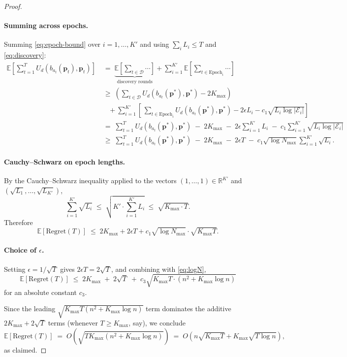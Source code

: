 \documentclass[11pt]{article}
\newcommand{\pvec}{\mathbf{p}}
\newcommand{\cE}{\mathcal{E}}
\newcommand{\cD}{\mathcal{D}}
\newcommand{\EE}{\mathbb{E}}
\newcommand{\RR}{\mathbb{R}}
\newcommand{\Kmax}{K_{\max}}
\begin{document}
\begin{proof}
\paragraph{Summing across epochs.} Summing \eqref{eq:epoch-bound} over $i=1,\dots,K'$ and using $\sum_i L_i \le T$ and \eqref{eq:discovery}:
\begin{align*}
\EE\!\left[\sum_{t=1}^T U_d(b_{a_t}(\pvec_t), \pvec_t)\right]
&\;=\; \underbrace{\EE\!\left[\sum_{t\in\cD} \cdots\right]}_{\text{discovery rounds}} + \sum_{i=1}^{K'} \EE\!\left[\sum_{t\in\mathrm{Epoch}_i}\cdots\right] \\
&\;\ge\; \left(\sum_{t\in\cD} U_d(b_{a_t}(\pvec^{*}), \pvec^{*}) - 2\Kmax\right) \\
&\quad+ \sum_{i=1}^{K'}\!\left[\,\sum_{t\in\mathrm{Epoch}_i} U_d(b_{a_t}(\pvec^{*}), \pvec^{*}) - 2\epsilon L_i - c_1\sqrt{L_i\log|\cE_i|}\right] \\
&\;=\; \sum_{t=1}^T U_d(b_{a_t}(\pvec^{*}),\pvec^{*}) \;-\; 2\Kmax \;-\; 2\epsilon\!\sum_{i=1}^{K'} L_i \;-\; c_1\!\sum_{i=1}^{K'}\sqrt{L_i \log|\cE_i|} \\
&\;\ge\; \sum_{t=1}^T U_d(b_{a_t}(\pvec^{*}),\pvec^{*}) \;-\; 2\Kmax \;-\; 2\epsilon T \;-\; c_1\sqrt{\log N_{\max}} \sum_{i=1}^{K'}\sqrt{L_i}.
\end{align*}

\paragraph{Cauchy--Schwarz on epoch lengths.} By the Cauchy--Schwarz inequality applied to the vectors $(1,\dots,1)\in\RR^{K'}$ and $(\sqrt{L_1},\dots,\sqrt{L_{K'}})$,
\[
\sum_{i=1}^{K'} \sqrt{L_i} \;\le\; \sqrt{K' \cdot \sum_{i=1}^{K'} L_i} \;\le\; \sqrt{\Kmax \cdot T}.
\]
Therefore
\begin{equation}\label{eq:final1}
\EE[\mathrm{Regret}(T)] \;\le\; 2\Kmax + 2\epsilon T + c_1 \sqrt{\log N_{\max}} \cdot \sqrt{\Kmax T}.
\end{equation}

\paragraph{Choice of $\epsilon$.} Setting $\epsilon = 1/\sqrt{T}$ gives $2\epsilon T = 2\sqrt{T}$, and combining with \eqref{eq:logN},
\[
\EE[\mathrm{Regret}(T)] \;\le\; 2\Kmax \;+\; 2\sqrt{T} \;+\; c_3 \sqrt{\Kmax T \cdot (n^2 + \Kmax \log n)}
\]
for an absolute constant $c_3$.

Since the leading $\sqrt{\Kmax T (n^2 + \Kmax\log n)}$ term dominates the additive $2\Kmax + 2\sqrt{T}$ terms (whenever $T\ge \Kmax$, say), we conclude
\[
\EE[\mathrm{Regret}(T)] \;=\; O\!\left(\sqrt{T \Kmax (n^2 + \Kmax \log n)}\right) \;=\; O\!\left(n\sqrt{\Kmax T} + \Kmax \sqrt{T \log n}\right),
\]
as claimed. \qedhere
\end{proof}
\end{document}
